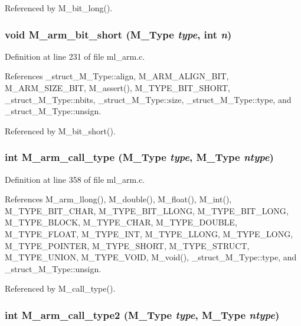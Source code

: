 Referenced by M\_\-bit\_\-long().
\subsubsection{\setlength{\rightskip}{0pt plus 5cm}void M\_\-arm\_\-bit\_\-short (\bf{M\_\-Type} {\em type}, int {\em n})}\label{m__arm_8h_18a47ead648da366e30fe84268a9b624}




Definition at line 231 of file ml\_\-arm.c.

References \_\-struct\_\-M\_\-Type::align, M\_\-ARM\_\-ALIGN\_\-BIT, M\_\-ARM\_\-SIZE\_\-BIT, M\_\-assert(), M\_\-TYPE\_\-BIT\_\-SHORT, \_\-struct\_\-M\_\-Type::nbits, \_\-struct\_\-M\_\-Type::size, \_\-struct\_\-M\_\-Type::type, and \_\-struct\_\-M\_\-Type::unsign.

Referenced by M\_\-bit\_\-short().
\subsubsection{\setlength{\rightskip}{0pt plus 5cm}int M\_\-arm\_\-call\_\-type (\bf{M\_\-Type} {\em type}, \bf{M\_\-Type} {\em ntype})}\label{m__arm_8h_470a962d166d8fd454e315f3ca9ad5c1}




Definition at line 358 of file ml\_\-arm.c.

References M\_\-arm\_\-llong(), M\_\-double(), M\_\-float(), M\_\-int(), M\_\-TYPE\_\-BIT\_\-CHAR, M\_\-TYPE\_\-BIT\_\-LLONG, M\_\-TYPE\_\-BIT\_\-LONG, M\_\-TYPE\_\-BLOCK, M\_\-TYPE\_\-CHAR, M\_\-TYPE\_\-DOUBLE, M\_\-TYPE\_\-FLOAT, M\_\-TYPE\_\-INT, M\_\-TYPE\_\-LLONG, M\_\-TYPE\_\-LONG, M\_\-TYPE\_\-POINTER, M\_\-TYPE\_\-SHORT, M\_\-TYPE\_\-STRUCT, M\_\-TYPE\_\-UNION, M\_\-TYPE\_\-VOID, M\_\-void(), \_\-struct\_\-M\_\-Type::type, and \_\-struct\_\-M\_\-Type::unsign.

Referenced by M\_\-call\_\-type().
\subsubsection{\setlength{\rightskip}{0pt plus 5cm}int M\_\-arm\_\-call\_\-type2 (\bf{M\_\-Type} {\em type}, \bf{M\_\-Type} {\em ntype})}\label{m__arm_8h_76009f8346aed501aff6fce15d6e1b67}




